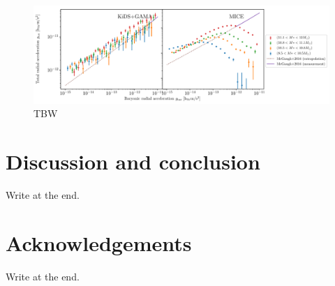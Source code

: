 \documentclass[fleqn,usenatbib]{mnras}
\begin{document}
\begin{figure}
	\includegraphics[width=1.0\textwidth]{Figures/RAR_KiDS+MICE_massbins-8p5_10p5_10p8_11p1_12p0_transverse.pdf}
	\caption{TBW}
\end{figure}


\section{Discussion and conclusion}
\label{sec:discon}
Write at the end.

\section*{Acknowledgements}
Write at the end.
\end{document}

